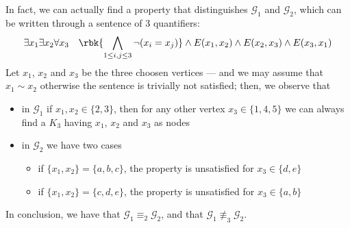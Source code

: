 \documentclass[a4paper, 12pt]{report}
\begin{document}
{        In fact, we can actually find a property that distinguishes $\mathcal G_1$ and $\mathcal G_2$, which can be written through a sentence of 3 quantifiers:  $$\exists x_1 \exists x_2 \forall x_3 \quad \rbk{\bigwedge_{1 \le i, j \le 3}{\lnot (x_i = x_j)}} \land E(x_1, x_2) \land E(x_2, x_3) \land E(x_3, x_1)$$ Let $x_1$, $x_2$ and $x_3$ be the three choosen vertices --- and we may assume that $x_1 \sim x_2$ otherwise the sentence is trivially not satisfied; then, we observe that

        \begin{itemize}
            \item in $\mathcal G_1$ if $x_1, x_2 \in \{2, 3\}$, then for any other vertex $x_3 \in \{1, 4, 5\}$ we can always find a $K_3$ having $x_1$, $x_2$ and $x_3$ as nodes
            \item in $\mathcal G_2$ we have two cases
                \begin{itemize}
                    \item if $\{x_1, x_2\} = \{a, b, c\}$, the property is unsatisfied for $x_3 \in \{d, e\}$
                    \item if $\{x_1, x_2\} = \{c, d, e\}$, the property is unsatisfied for $x_3 \in \{a, b\}$
                \end{itemize}
        \end{itemize}

        In conclusion, we have that $\mathcal G_1 \equiv_2 \mathcal G_2$, and that $\mathcal G_1 \not\equiv_3 \mathcal G_2$.
    }

    \printbibliography %
\end{document}
